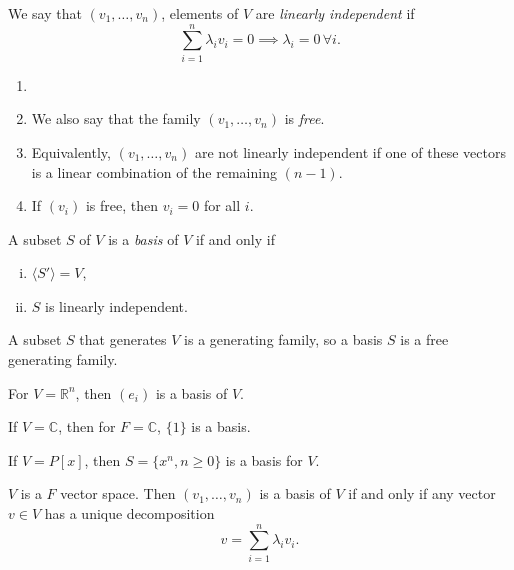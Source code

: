 \documentclass[12pt]{article}
\begin{document}
\begin{definition}[Independence]
	We say that $(v_1, \ldots, v_n)$, elements of $V$ are \textit{linearly independent} if
	\[
	\sum_{i = 1}^{n} \lambda_i v_i = 0 \implies \lambda_i = 0 \, \forall i
	.\]
\end{definition}

\begin{remark}
	\begin{enumerate}[1.]
		\item[]
		\item We also say that the family $(v_1, \ldots, v_n)$ is \textit{free}.
		\item Equivalently, $(v_1, \ldots, v_n)$ are not linearly independent if one of these vectors is a linear combination of the remaining $(n-1)$.
		\item If $(v_i)$ is free, then $v_i = 0$ for all $i$.
	\end{enumerate}
	
\end{remark}

\begin{definition}[Basis]
	A subset $S$ of $V$ is a \textit{basis} of $V$ if and only if
	\begin{enumerate}[(i)]
		\item $\langle S' \rangle = V$,
		\item $S$ is linearly independent.
	\end{enumerate}
	
\end{definition}

\begin{remark}
	A subset $S$ that generates $V$ is a generating family, so a basis $S$ is a free generating family.
\end{remark}

\begin{exbox}
	For $V = \mathbb{R}^{n}$, then $(e_i)$ is a basis of $V$.

	If $V = \mathbb{C}$, then for $F = \mathbb{C}$, $\{1\}$ is a basis.

	If $V = P[x]$, then $S = \{x^{n}, n \geq 0\}$ is a basis for $V$.

\end{exbox}

\begin{lemma}
	$V$ is a $F$ vector space. Then $(v_1, \ldots, v_n)$ is a basis of $V$ if and only if any vector $v \in V$ has a unique decomposition
	\[
	v = \sum_{i = 1}^{n} \lambda_i v_i
	.\]
\end{lemma}
\end{document}
